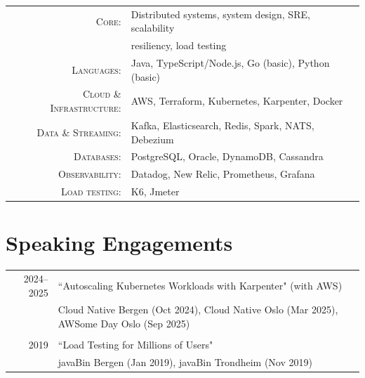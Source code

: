 \documentclass[a4paper,10pt]{article} %
\begin{document}
\begin{tabular}{rl}

\textsc{Core:} & Distributed systems, system design, SRE, scalability \\
& resiliency, load testing \\

\textsc{Languages:} & Java, TypeScript/Node.js, Go (basic), Python (basic) \\

\textsc{Cloud \& Infrastructure:} & AWS, Terraform, Kubernetes, Karpenter, Docker \\

\textsc{Data \& Streaming:} & Kafka, Elasticsearch, Redis, Spark, NATS, Debezium \\

\textsc{Databases:} & PostgreSQL, Oracle, DynamoDB, Cassandra \\

\textsc{Observability:} & Datadog, New Relic, Prometheus, Grafana \\

\textsc{Load testing:} & K6, Jmeter \\

\end{tabular}

\section{Speaking Engagements}

\begin{tabular}{r|p{11cm}}

\textsc{2024--2025} & ``Autoscaling Kubernetes Workloads with Karpenter" (with AWS) \\
& Cloud Native Bergen (Oct 2024), Cloud Native Oslo (Mar 2025), AWSome Day Oslo (Sep 2025) \\
\multicolumn{2}{c}{} \\

\textsc{2019} & ``Load Testing for Millions of Users" \\
& javaBin Bergen (Jan 2019), javaBin Trondheim (Nov 2019) \\

\end{tabular}

\end{document}
